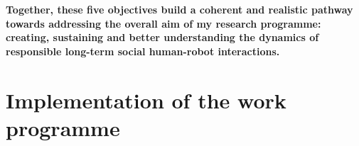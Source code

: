 \begin{framed}

\noindent\bf Together, these five objectives build a coherent and realistic
pathway towards addressing the overall aim of my research programme:
creating, sustaining and better understanding the dynamics of responsible
long-term social human-robot interactions.

\end{framed}











\newpage
\section{Implementation of the work programme}

